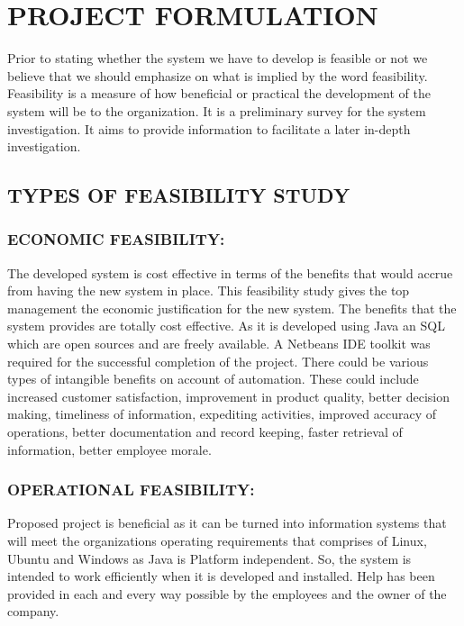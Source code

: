 \section{PROJECT FORMULATION}

Prior to stating whether the system we have to develop is feasible or not we believe that we should emphasize on what is implied by the word feasibility. Feasibility is a measure of how beneficial or practical the development of the system will be to the organization. It is a preliminary survey for the system investigation. It aims to provide information to facilitate a later in-depth investigation.

\subsection{TYPES OF FEASIBILITY STUDY}
\subsubsection{ECONOMIC FEASIBILITY:}
The developed system is cost effective in terms of the benefits that would accrue from having the new system in place. This feasibility study gives the top management the economic justification for the new system. The benefits that the system provides are totally cost effective. As it is developed using Java an SQL which are open sources and are freely available. A Netbeans IDE toolkit was required for the successful completion of the project. There could be various types of intangible benefits on account of automation. These could include increased customer satisfaction, improvement in product quality, better decision making, timeliness of information, expediting activities, improved accuracy of operations, better documentation and record keeping, faster retrieval of information, better employee morale.

\subsubsection{OPERATIONAL FEASIBILITY:}
Proposed project is beneficial as it can be turned into information systems that will meet the organizations operating requirements that comprises of Linux, Ubuntu and Windows as Java is Platform independent. So, the system is intended to work efficiently when it is developed and installed. Help has been provided in each and every way possible by the employees and the owner of the company.


